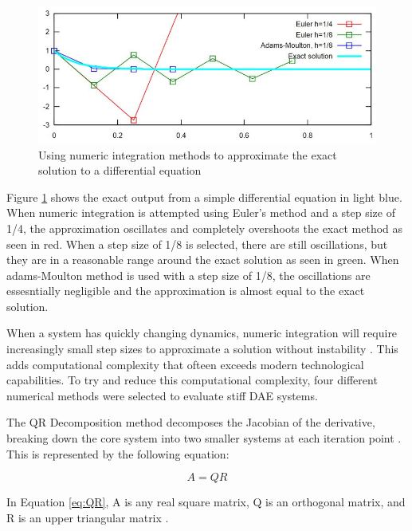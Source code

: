 \begin{figure}[!htb]
	\centering
	\includegraphics[width=\linewidth]{stiffsystem.JPG}
	\caption{Using numeric integration methods to approximate the exact solution to a differential equation}\label{fig:stiffsystem}
	\endminipage
\end{figure}
Figure \ref{fig:stiffsystem} shows the exact output from a simple differential equation in light blue. 
When numeric integration is attempted using Euler's method and a step size of 1/4, the approximation oscillates and completely overshoots the exact method as seen in red. 
When a step size of 1/8 is selected, there are still oscillations, but they are in a reasonable range around the exact solution as seen in green. 
When adams-Moulton method is used with a step size of 1/8, the oscillations are essesntially negligible and the approximation is almost equal to the exact solution.


\par
When a system has quickly changing dynamics, numeric integration will require increasingly small step sizes to approximate a solution without instability \cite{StiffSystem}. 
This adds computational complexity that ofteen exceeds modern technological capabilities. 
To try and reduce this computational complexity, four different numerical methods were selected to evaluate stiff DAE systems.

The QR Decomposition method decomposes the Jacobian of the derivative, breaking down the core system into two smaller systems at each iteration point \cite{Methods}.
This is represented by the following equation:

\begin{equation}
\label{eq:QR}
A = QR
\end{equation}

In Equation \ref{eq:QR}, A is any real square matrix, Q is an orthogonal matrix, and R is an upper triangular matrix \cite{Methods}.

